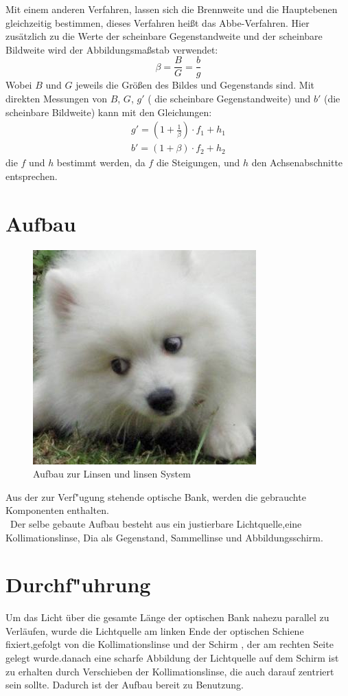 \documentclass[11pt,a4paper]{article}
\begin{document}
Mit einem anderen Verfahren, lassen sich die Brennweite und die Hauptebenen gleichzeitig bestimmen, dieses Verfahren heißt das Abbe-Verfahren. Hier zusätzlich zu die Werte der scheinbare Gegenstandweite und der scheinbare Bildweite wird  der Abbildungsmaßstab verwendet: 
$$ \beta = \frac{B}{G} = \frac{b}{g}$$
Wobei $B$ und $G$ jeweils die Größen des Bildes und Gegenstands sind. 
Mit direkten Messungen von $B$, $G$, $g'$ ( die scheinbare Gegenstandweite) und $b'$ (die scheinbare Bildweite) kann mit den Gleichungen:
\begin{equation}
\begin{array}{l}
	g' = (1+\frac{1}{\beta})\cdot f_1 + h_1 \\
	b' = (1+\beta)\cdot f_2 + h_2
\end{array}
\end{equation}
die $f$ und $h$ bestimmt werden, da $f$ die Steigungen, und $h$ den Achsenabschnitte entsprechen. 



\section{Aufbau}
\begin{figure}[h]
	\centering
	\includegraphics[scale=0.5]{ver70}
	\caption{Aufbau zur Linsen und linsen System}
\end{figure}

Aus der zur Verf"ugung stehende optische Bank, werden die gebrauchte Komponenten enthalten.
\\\
Der selbe gebaute Aufbau besteht aus ein justierbare Lichtquelle,eine Kollimationslinse, Dia als Gegenstand, Sammellinse und Abbildungsschirm.
\section{Durchf"uhrung}
Um das Licht über die gesamte Länge der optischen Bank nahezu parallel zu Verläufen, wurde die Lichtquelle am linken Ende der optischen Schiene fixiert,gefolgt von die Kollimationslinse und der Schirm , der am rechten Seite gelegt wurde.danach eine scharfe Abbildung der Lichtquelle auf dem Schirm ist zu erhalten durch Verschieben der Kollimationslinse, die auch darauf zentriert sein sollte.
Dadurch ist der Aufbau bereit zu Benutzung.
\end{document}
